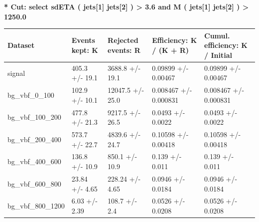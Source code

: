 \documentclass[a4paper, 10pt]{article}
\begin{document}
\textbf{* Cut: select sdETA ( jets[1] jets[2] ) > 3.6 and M ( jets[1] jets[2] ) > 1250.0}\\
   \begin{table}[H]
  \begin{center}
    \begin{tabular}{|m{20.0mm}|m{27.0mm}|m{27.0mm}|m{33.0mm}|m{32.0mm}|}
      \hline
      {\cellcolor{yellow}         Dataset}& {\cellcolor{yellow}         Events kept:
          K}& {\cellcolor{yellow}         Rejected events:
          R}& {\cellcolor{yellow}         Efficiency:
          K /\- (K + R)}& {\cellcolor{yellow}         Cumul. efficiency:
          K /\- Initial}\\
      \hline
      {\cellcolor{white}         signal}& {\cellcolor{white}         405.3 +/\-- 19.1}& {\cellcolor{white}         3688.8 +/\-- 19.1}& {\cellcolor{white}         0.09899 +/\-- 0.00467}& {\cellcolor{white}         0.09899 +/\-- 0.00467}\\
      \hline
      {\cellcolor{white}         bg\_vbf\_0\_100}& {\cellcolor{white}         102.9 +/\-- 10.1}& {\cellcolor{white}         12047.5 +/\-- 25.0}& {\cellcolor{white}         0.008467 +/\-- 0.000831}& {\cellcolor{white}         0.008467 +/\-- 0.000831}\\
      \hline
      {\cellcolor{white}         bg\_vbf\_100\_200}& {\cellcolor{white}         477.8 +/\-- 21.3}& {\cellcolor{white}         9217.5 +/\-- 26.5}& {\cellcolor{white}         0.0493 +/\-- 0.0022}& {\cellcolor{white}         0.0493 +/\-- 0.0022}\\
      \hline
      {\cellcolor{white}         bg\_vbf\_200\_400}& {\cellcolor{white}         573.7 +/\-- 22.7}& {\cellcolor{white}         4839.6 +/\-- 24.7}& {\cellcolor{white}         0.10598 +/\-- 0.00418}& {\cellcolor{white}         0.10598 +/\-- 0.00418}\\
      \hline
      {\cellcolor{white}         bg\_vbf\_400\_600}& {\cellcolor{white}         136.8 +/\-- 10.9}& {\cellcolor{white}         850.1 +/\-- 10.9}& {\cellcolor{white}         0.139 +/\-- 0.011}& {\cellcolor{white}         0.139 +/\-- 0.011}\\
      \hline
      {\cellcolor{white}         bg\_vbf\_600\_800}& {\cellcolor{white}         23.84 +/\-- 4.65}& {\cellcolor{white}         228.24 +/\-- 4.65}& {\cellcolor{white}         0.0946 +/\-- 0.0184}& {\cellcolor{white}         0.0946 +/\-- 0.0184}\\
      \hline
      {\cellcolor{white}         bg\_vbf\_800\_1200}& {\cellcolor{white}         6.03 +/\-- 2.39}& {\cellcolor{white}         108.7 +/\-- 2.4}& {\cellcolor{white}         0.0526 +/\-- 0.0208}& {\cellcolor{white}         0.0526 +/\-- 0.0208}\\

\end{tabular}
\end{center}
\end{table}
\end{document}
